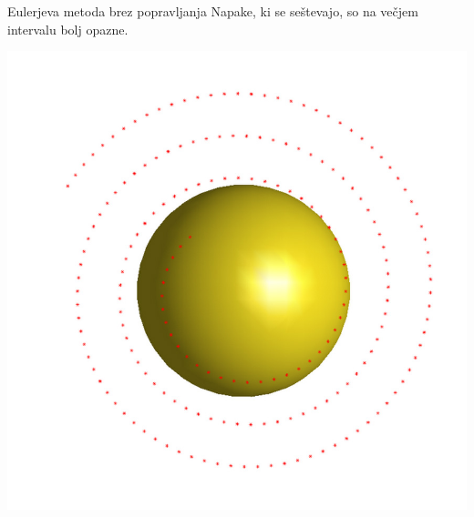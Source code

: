 \documentclass{beamer}
\begin{document}
	\begin{frame}{Eulerjeva metoda brez popravljanja}
		Napake, ki se seštevajo, so na večjem intervalu bolj opazne.\\
		\begin{center}
			\includegraphics[scale=0.30]{eul2}
		\end{center}	
	\end{frame}
	
\end{document}
